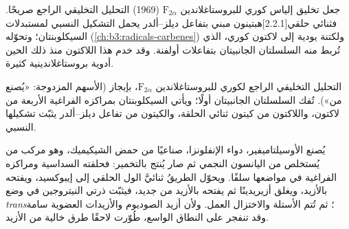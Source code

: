 جعل تخليق إلياس كوري للبروستاغلاندين $\mathrm F_{2\alpha}$ (1969) التحليل التخليقي الراجع
صريحًا. فثنائي حلقي[2.2.1]هبتينون مبني بتفاعل ديلز--ألدر يحمل
التشكيل النسبي لمستبدلات السيكلوبنتان؛ وتحوّله
 (\cref{ch:b3:radicals-carbenes}) 
ولكتنة يودية إلى لاكتون كوري، الذي تُربط منه السلسلتان الجانبيتان
بتفاعلات أولفنة. وقد خدم هذا اللاكتون منذ ذلك الحين أدوية بروستاغلاندينية كثيرة.

\begin{omfigure}

{\small التحليل التخليقي الراجع لكوري للبروستاغلاندين $\mathrm F_{2\alpha}$، بإيجاز (الأسهم المزدوجة: «يُصنع
من»). تُفك السلسلتان الجانبيتان أولًا؛ ويأتي السيكلوبنتان بمراكزه
الفراغية الأربعة من لاكتون، واللاكتون من كيتون ثنائي الحلقة،
والكيتون من تفاعل ديلز--ألدر يثبّت تشكيلها
النسبي.}
\end{omfigure}

يُصنع الأوسيلتاميفير، دواء الإنفلونزا، صناعيًا من حمض الشيكيميك، وهو
مركب من  يُستخلص من اليانسون النجمي ثم صار يُنتج
بالتخمير: فحلقته السداسية ومراكزه الفراغية في مواضعها سلفًا.
ويحوّل الطريقُ ثنائيَّ الول الحلقي إلى إيبوكسيد، ويفتحه بالأزيد، ويغلق
أزيريدينًا ثم يفتحه بالأزيد من جديد، فيثبّت ذرتي النيتروجين في وضع
\textit{trans}؛ ثم تُتم الأستلة والاختزال العمل. ولأن أزيد الصوديوم 
والأزيدات العضوية سامة وقد تنفجر على النطاق الواسع، طُوّرت لاحقًا طرق
خالية من الأزيد.

